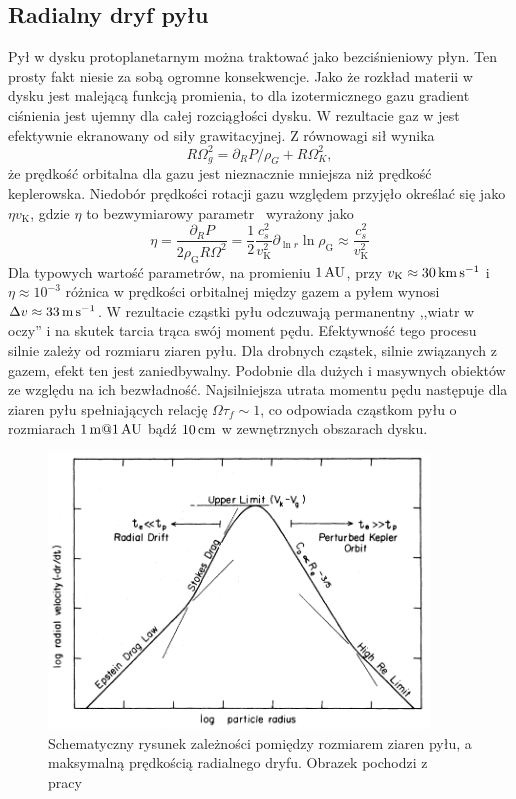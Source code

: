 \subsection{Radialny dryf pyłu}
Pył w dysku protoplanetarnym można traktować jako bezciśnieniowy płyn. Ten
prosty fakt niesie za sobą ogromne konsekwencje. Jako że rozkład materii w dysku
jest malejącą funkcją promienia, to dla izotermicznego gazu gradient ciśnienia
jest ujemny dla całej rozciągłości dysku. W rezultacie gaz w jest efektywnie
ekranowany od siły grawitacyjnej. Z równowagi sił wynika
\begin{equation}
   R\Omega_g^2 = \partial_R P / \rho_G + R\Omega_K^2,
\end{equation}
że prędkość orbitalna dla gazu jest nieznacznie mniejsza niż prędkość
keplerowska. Niedobór prędkości rotacji gazu względem przyjęło określać się jako
$\eta v_\textrm{K}$, gdzie $\eta$ to bezwymiarowy parametr~\cite{N86}
wyrażony jako
\begin{equation}
   \label{eq:eta}
   \eta = \frac{\partial_R P}{2\rho_\textrm{G} R \Omega^2} = \frac{1}{2}
   \frac{c_s^2}{v_\textrm{K}^2} \partial_{\ln r} \ln \rho_{\textrm{G}} \approx
   \frac{c_s^2}{v_\textrm{K}^2}
\end{equation}
Dla typowych wartość parametrów, na promieniu $1\hbox{$\thinspace\textrm{AU}$}$, przy $v_\textrm{K}\approx
30\hbox{$\thinspace\textrm{km}$}\hbox{$\thinspace\textrm{s}$}^{-1}$ i $\eta \approx 10^{-3}$ różnica w prędkości orbitalnej między
gazem a pyłem wynosi $\Delta v \approx 33\hbox{$\thinspace\textrm{m}$}\hbox{$\thinspace\textrm{s}$}^{-1}$.
W rezultacie cząstki pyłu odczuwają permanentny ,,wiatr w oczy'' i na skutek
tarcia trąca swój moment pędu. Efektywność tego procesu silnie zależy od
rozmiaru ziaren pyłu. Dla drobnych cząstek, silnie związanych z gazem, efekt ten
jest zaniedbywalny. Podobnie dla dużych i masywnych obiektów ze względu na ich
bezwładność. Najsilniejsza utrata momentu pędu następuje dla ziaren pyłu
spełniających relację $\Omega \tau_f \sim 1$, co odpowiada cząstkom pyłu
o rozmiarach $1\hbox{$\thinspace\textrm{m}$} @ 1\hbox{$\thinspace\textrm{AU}$}$ bądź $10\hbox{$\thinspace\textrm{cm}$}$ w zewnętrznych obszarach dysku.

\begin{figure}
   \includegraphics[width=0.9\textwidth]{figures/chap1_drift.png}
   \caption{Schematyczny rysunek zależności pomiędzy rozmiarem ziaren pyłu, a
   maksymalną prędkością radialnego dryfu. Obrazek pochodzi z
   pracy~\cite{W77}}
   \label{fig:chap1_drift}
\end{figure}

